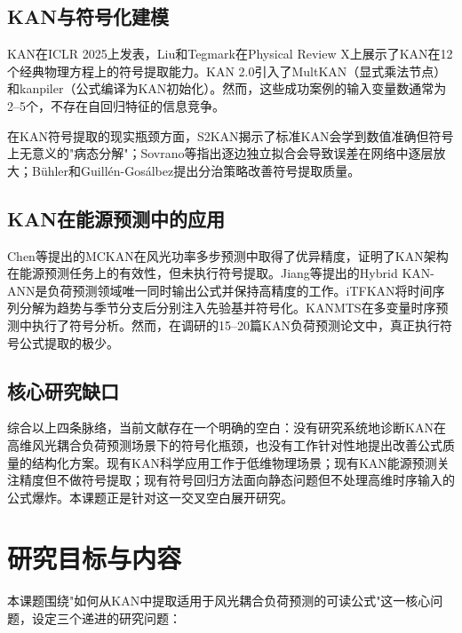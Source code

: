 \documentclass[12pt,a4paper,oneside]{ctexbook}
\begin{document}
\subsection{KAN与符号化建模}

KAN\cite{liu2025kan}在ICLR 2025上发表，Liu和Tegmark\cite{liu2025kan2}在Physical Review X上展示了KAN在12个经典物理方程上的符号提取能力。KAN 2.0引入了MultKAN（显式乘法节点）和kanpiler（公式编译为KAN初始化）。然而，这些成功案例的输入变量数通常为2--5个，不存在自回归特征的信息竞争。

在KAN符号提取的现实瓶颈方面，S2KAN\cite{bagrow2025s2kan}揭示了标准KAN会学到数值准确但符号上无意义的"病态分解"；Sovrano等\cite{sovrano2026incontext}指出逐边独立拟合会导致误差在网络中逐层放大；Bühler和Guillén-Gosálbez\cite{buhler2025kansr}提出分治策略改善符号提取质量。

\subsection{KAN在能源预测中的应用}

Chen等\cite{chen2025mckan}提出的MCKAN在风光功率多步预测中取得了优异精度，证明了KAN架构在能源预测任务上的有效性，但未执行符号提取。Jiang等\cite{jiang2024kanann}提出的Hybrid KAN-ANN是负荷预测领域唯一同时输出公式并保持高精度的工作。iTFKAN\cite{itfkan2025}将时间序列分解为趋势与季节分支后分别注入先验基并符号化。KANMTS\cite{kanmts2025}在多变量时序预测中执行了符号分析。然而，在调研的15--20篇KAN负荷预测论文中，真正执行符号公式提取的极少。

\subsection{核心研究缺口}

综合以上四条脉络，当前文献存在一个明确的空白：没有研究系统地诊断KAN在高维风光耦合负荷预测场景下的符号化瓶颈，也没有工作针对性地提出改善公式质量的结构化方案。现有KAN科学应用工作于低维物理场景\cite{liu2025kan,liu2025kan2}；现有KAN能源预测关注精度但不做符号提取\cite{chen2025mckan,mubarak2024kan}；现有符号回归方法面向静态问题但不处理高维时序输入的公式爆炸\cite{cranmer2023pysr}。本课题正是针对这一交叉空白展开研究。

\section{研究目标与内容}

本课题围绕"如何从KAN中提取适用于风光耦合负荷预测的可读公式"这一核心问题，设定三个递进的研究问题：
\end{document}
